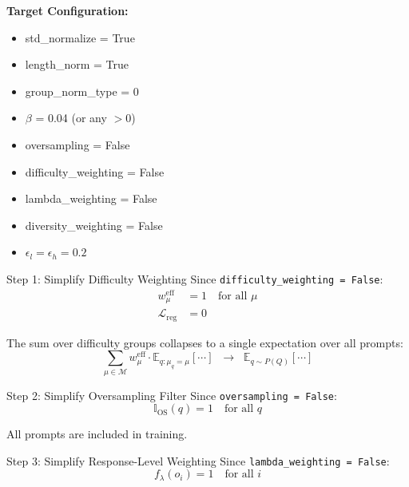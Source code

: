 \documentclass[11pt,a4paper]{article}
\begin{document}
\begin{configbox}
\textbf{Target Configuration:}
\begin{itemize}[noitemsep]
    \item std\_normalize = True
    \item length\_norm = True
    \item group\_norm\_type = 0
    \item $\beta$ = 0.04 (or any $> 0$)
    \item oversampling = False
    \item difficulty\_weighting = False
    \item lambda\_weighting = False
    \item diversity\_weighting = False
    \item $\epsilon_l = \epsilon_h = 0.2$
\end{itemize}
\end{configbox}

\begin{proofbox}{Step 1: Simplify Difficulty Weighting}
Since \texttt{difficulty\_weighting = False}:
\begin{align}
w_\mu^{\text{eff}} &= 1 \quad \text{for all } \mu \\
\mathcal{L}_{\text{reg}} &= 0
\end{align}

The sum over difficulty groups collapses to a single expectation over all prompts:
\begin{equation}
\sum_{\mu \in \mathcal{M}} w_\mu^{\text{eff}} \cdot \mathbb{E}_{q: \mu_q = \mu}[\cdots] \;\;\longrightarrow\;\; \mathbb{E}_{q \sim P(Q)}[\cdots]
\end{equation}
\end{proofbox}

\begin{proofbox}{Step 2: Simplify Oversampling Filter}
Since \texttt{oversampling = False}:
\begin{equation}
\mathbb{I}_{\text{OS}}(q) = 1 \quad \text{for all } q
\end{equation}

All prompts are included in training.
\end{proofbox}

\begin{proofbox}{Step 3: Simplify Response-Level Weighting}
Since \texttt{lambda\_weighting = False}:
\begin{equation}
f_\lambda(o_i) = 1 \quad \text{for all } i
\end{equation}
\end{proofbox}
\end{document}
